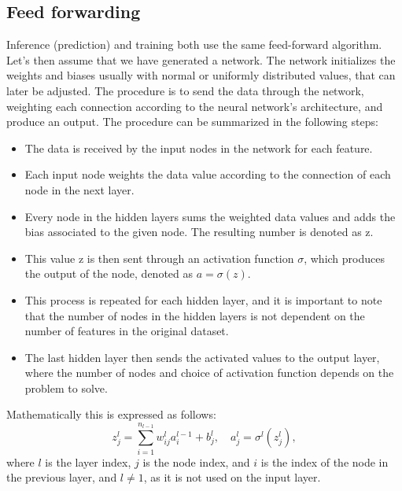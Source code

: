 \subsection*{Feed forwarding}
Inference (prediction) and training both use the same feed-forward algorithm. Let's then assume that we have generated a 
network. The network initializes the weights and biases usually with normal or uniformly distributed values, that can 
later be adjusted. The procedure is to send the data through the network, weighting each connection according to the neural network's 
architecture, and produce an output. The procedure can be summarized in the following steps\cite{FYSSTK}:
 \begin{itemize}
    \item The data is received by the input nodes in the network for each feature.
    \item Each input node weights the data value according to the connection of each node in the next layer.
    \item Every node in the hidden layers sums the weighted data values and adds the bias associated to the given node. The resulting number is denoted as z. 
    \item This value z is then sent through an activation function $\sigma$, which produces the output of the node, denoted as $a = \sigma(z)$.
    \item This process is repeated for each hidden layer, and it is important to note that the number of nodes in the hidden layers is not dependent on the number of features in the original dataset. 
    \item The last hidden layer then sends the activated values to the output layer, where the number of nodes and choice of activation function depends on the problem to solve.
 \end{itemize}

Mathematically this is expressed as follows:
\begin{equation}
    z_j^l = \sum_{i=1}^{n_{l-1}} w_{ij}^l a_i^{l-1} + b_j^l, \quad a_j^l = \sigma^l(z_j^l),
\end{equation}
where $l$ is the layer index, $j$ is the node index, and $i$ is the index of the node in the previous layer, 
and $l \neq 1$, as it is not used on the input layer.



